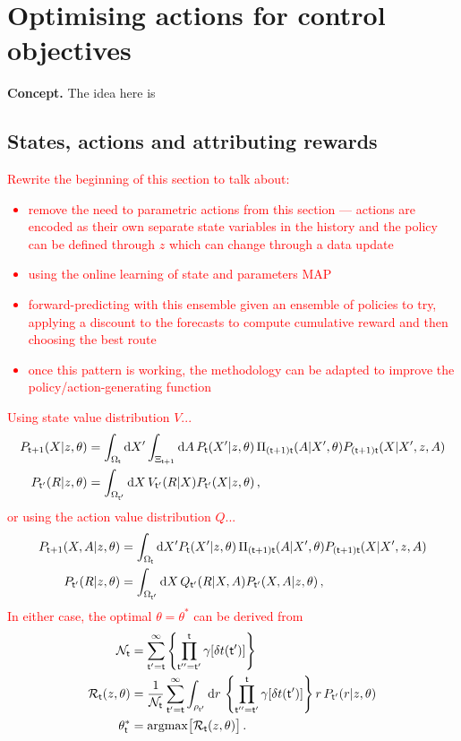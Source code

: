 \chapter{\sffamily Optimising actions for control objectives}

{\bfseries\sffamily Concept.} The idea here is 

\section{\sffamily States, actions and attributing rewards}

\textcolor{red}{Rewrite the beginning of this section to talk about:
\begin{itemize}
\item{remove the need to parametric actions from this section --- actions are encoded as their own separate state variables in the history and the policy can be defined through $z$ which can change through a data update}
\item{using the online learning of state and parameters MAP}
\item{forward-predicting with this ensemble given an ensemble of policies to try, applying a discount to the forecasts to compute cumulative reward and then choosing the best route}
\item{once this pattern is working, the methodology can be adapted to improve the policy/action-generating function}    
\end{itemize}
Using state value distribution $V$...
\begin{align}
P_{{\sf t}+1}(X\vert z,\theta ) &= \int_{\Omega_{{\sf t}}}{\rm d}X' \int_{\Xi_{{\sf t}+1}}{\rm d}A \, P_{{\sf t}}(X'\vert z,\theta ) \, \Pi_{({\sf t}+1){\sf t}}(A\vert X',\theta)P_{({\sf t}+1){\sf t}}(X\vert X',z,A)  \\
P_{{\sf t}'}(R\vert z,\theta ) &= \int_{\Omega_{{\sf t}'}} {\rm d}X \, V_{{\sf t}'}(R\vert X)P_{{\sf t}'}(X\vert z,\theta ) \,,
\end{align}
or using the action value distribution $Q$...
\begin{align}
P_{{\sf t}+1}(X,A\vert z,\theta ) &= \int_{\Omega_{{\sf t}}}{\rm d}X' P_{{\sf t}}(X'\vert z,\theta ) \, \Pi_{({\sf t}+1){\sf t}}(A\vert X',\theta)P_{({\sf t}+1){\sf t}}(X\vert X',z,A) \\
P_{{\sf t}'}(R\vert z,\theta ) &= \int_{\Omega_{{\sf t}'}} {\rm d}X \, Q_{{\sf t}'}(R\vert X,A)P_{{\sf t}'}(X,A\vert z,\theta ) \,,
\end{align}
In either case, the optimal $\theta = \theta^*$ can be derived from
\begin{align}
{\cal N}_{{\sf t}} &= \sum_{{\sf t}'={\sf t}}^{\infty}\left\{ \prod_{{\sf t}''={\sf t}'}^{{\sf t}} \gamma [\delta t({\sf t}')] \right\} \\
{\cal R}_{{\sf t}}(z,\theta ) &= \frac{1}{{\cal N}_{{\sf t}}}\sum_{{\sf t}'={\sf t}}^{\infty}\int_{\rho_{{\sf t}'}} {\rm d}r \,\left\{ \prod_{{\sf t}''={\sf t}'}^{{\sf t}} \gamma [\delta t({\sf t}')] \right\} r \,P_{{\sf t}'}(r\vert z,\theta ) \\
\theta^*_{{\sf t}} &= {\rm argmax} \big[ {\cal R}_{{\sf t}}(z,\theta )\big] \,.
\end{align}
}

